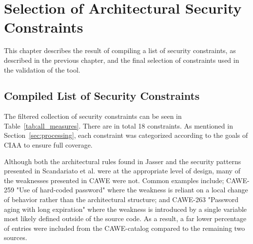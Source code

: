\chapter{Selection of Architectural Security Constraints}

This chapter describes the result of compiling a list of security constraints, as described in the previous chapter, and the final selection of constraints used in the validation of the tool.  

\section{Compiled List of Security Constraints}

The filtered collection of security constraints can be seen in Table~\ref{tab:all_measures}. There are in total 18 constraints. As mentioned in Section~\ref{sec:processing}, each constraint was categorized according to the goals of CIAA to ensure full coverage. 

Although both the architectural rules found in Jasser \cite{franch_constraining_2019} and the security patterns presented in Scandariato et al. \cite{scandariato_system_2006} were at the appropriate level of design, many of the weaknesses presented in CAWE were not. Common examples include; CAWE-259 "Use of hard-coded password" where the weakness is reliant on a local change of behavior rather than the architectural structure; and CAWE-263 "Password aging with long expiration" where the weakness is introduced by a single variable most likely defined outside of the source code. As a result, a far lower percentage of entries were included from the CAWE-catalog compared to the remaining two sources.




